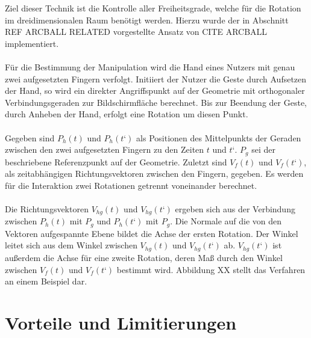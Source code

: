 Ziel dieser Technik ist die Kontrolle aller Freiheitsgrade, welche für die Rotation im dreidimensionalen Raum benötigt werden. Hierzu wurde der in Abschnitt REF ARCBALL RELATED vorgestellte Ansatz von CITE ARCBALL implementiert. 
\\\\
Für die Bestimmung der Manipulation wird die Hand eines Nutzers mit genau zwei aufgesetzten Fingern verfolgt. Initiiert der Nutzer die Geste durch Aufsetzen der Hand, so wird ein direkter Angriffspunkt auf der Geometrie mit orthogonaler Verbindungsgeraden zur Bildschirmfläche berechnet. Bis zur Beendung der Geste, durch Anheben der Hand, erfolgt eine Rotation um diesen Punkt.
\\\\
Gegeben sind $P_h(t)$ und $P_h(t‘)$ als Positionen des Mittelpunkts der Geraden zwischen den zwei aufgesetzten Fingern zu den Zeiten $t$ und $t‘$. $P_g$ sei der beschriebene Referenzpunkt auf der Geometrie. Zuletzt sind $V_f(t)$ und $V_f(t‘)$, als zeitabhängigen Richtungsvektoren zwischen den Fingern, gegeben. Es werden für die Interaktion zwei Rotationen getrennt voneinander berechnet.
\\\\
Die Richtungsvektoren $V_{hg}(t)$ und $V_{hg}(t‘)$ ergeben sich aus der Verbindung zwischen $P_h(t)$ mit $P_g$ und $P_h(t‘)$ mit $P_g$. Die Normale auf die von den Vektoren aufgespannte Ebene bildet die Achse der ersten Rotation. Der Winkel leitet sich aus dem Winkel zwischen $V_{hg}(t)$ und $V_{hg}(t‘)$ ab. $V_{hg}(t‘)$ ist außerdem die Achse für eine zweite Rotation, deren Maß durch den Winkel zwischen $V_f(t)$ und $V_f(t‘)$ bestimmt wird. Abbildung XX stellt das Verfahren an einem Beispiel dar.


\section{Vorteile und Limitierungen}
\label{sec:vorteile_und_limitierungen_explizit}


